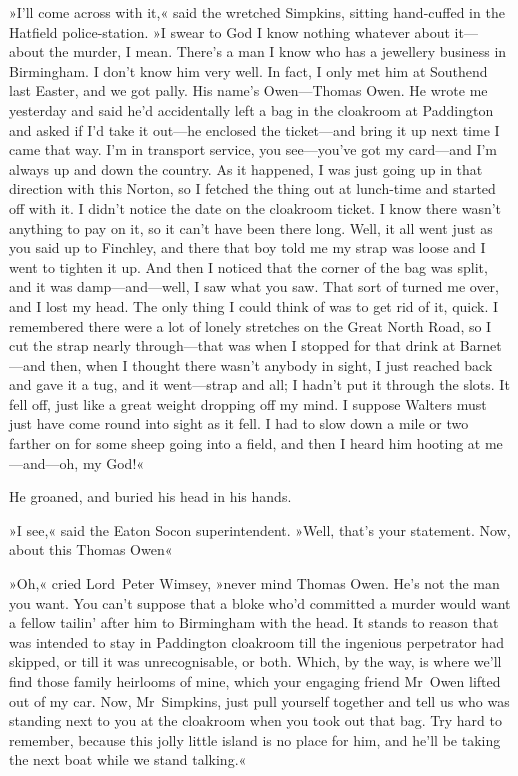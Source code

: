 »I'll come across with it,« said the wretched Simpkins, sitting hand-cuffed in the Hatfield police-station. »I swear to God I know nothing whatever about it—about the murder, I mean. There's a man I know who has a jewellery business in Birmingham. I don't know him very well. In fact, I only met him at Southend last Easter, and we got pally. His name's Owen—Thomas Owen. He wrote me yesterday and said he'd accidentally left a bag in the cloakroom at Paddington and asked if I'd take it out—he enclosed the ticket—and bring it up next time I came that way. I'm in transport service, you see—you've got my card—and I'm always up and down the country. As it happened, I was just going up in that direction with this Norton, so I fetched the thing out at lunch-time and started off with it. I didn't notice the date on the cloakroom ticket. I know there wasn't anything to pay on it, so it can't have been there long. Well, it all went just as you said up to Finchley, and there that boy told me my strap was loose and I went to tighten it up. And then I noticed that the corner of the bag was split, and it was damp—and—well, I saw what you saw. That sort of turned me over, and I lost my head. The only thing I could think of was to get rid of it, quick. I remembered there were a lot of lonely stretches on the Great North Road, so I cut the strap nearly through—that was when I stopped for that drink at Barnet—and then, when I thought there wasn't anybody in sight, I just reached back and gave it a tug, and it went—strap and all; I hadn't put it through the slots. It fell off, just like a great weight dropping off my mind. I suppose Walters must just have come round into sight as it fell. I had to slow down a mile or two farther on for some sheep going into a field, and then I heard him hooting at me—and—oh, my God!«

He groaned, and buried his head in his hands.

»I see,« said the Eaton Socon superintendent. »Well, that's your statement. Now, about this Thomas Owen\longdash«

»Oh,« cried Lord~Peter Wimsey, »never mind Thomas Owen. He's not the man you want. You can't suppose that a bloke who'd committed a murder would want a fellow tailin' after him to Birmingham with the head. It stands to reason that was intended to stay in Paddington cloakroom till the ingenious perpetrator had skipped, or till it was unrecognisable, or both. Which, by the way, is where we'll find those family heirlooms of mine, which your engaging friend Mr~Owen lifted out of my car. Now, Mr~Simpkins, just pull yourself together and tell us who was standing next to you at the cloakroom when you took out that bag. Try hard to remember, because this jolly little island is no place for him, and he'll be taking the next boat while we stand talking.«

